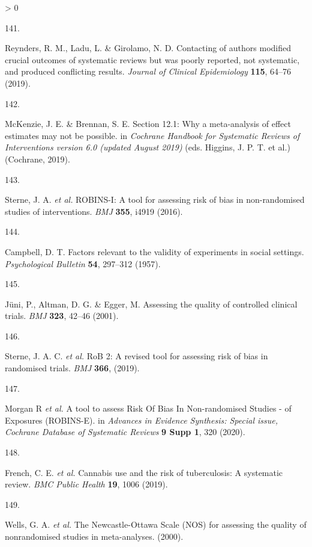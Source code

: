 \documentclass[a4paper, twoside]{templates/ociamthesis}
\newlength{\cslhangindent}
\newlength{\csllabelwidth}
\newenvironment{CSLReferences}[3] %
 {%
  \setlength{\parindent}{0pt}
  \ifodd #1 \everypar{\setlength{\hangindent}{\cslhangindent}}\ignorespaces\fi
  \ifnum #2 > 0
  \setlength{\parskip}{#2\baselineskip}
  \fi
 }%
 {}
\newcommand{\CSLLeftMargin}[1]{\parbox[t]{\maxof{\widthof{#1}}{\csllabelwidth}}{#1}}
\newcommand{\CSLRightInline}[1]{\parbox[t]{\linewidth - \csllabelwidth}{#1}}
\begin{document}
\begin{CSLReferences}{0}{0}
\leavevmode\hypertarget{ref-reynders2019}{}%
\CSLLeftMargin{141. }
\CSLRightInline{Reynders, R. M., Ladu, L. \& Girolamo, N. D. Contacting of authors modified crucial outcomes of systematic reviews but was poorly reported, not systematic, and produced conflicting results. \emph{Journal of Clinical Epidemiology} \textbf{115}, 64--76 (2019).}

\leavevmode\hypertarget{ref-mckenzie2019}{}%
\CSLLeftMargin{142. }
\CSLRightInline{McKenzie, J. E. \& Brennan, S. E. Section 12.1: Why a meta-analysis of effect estimates may not be possible. in \emph{Cochrane {Handbook} for {Systematic Reviews} of {Interventions} version 6.0 (updated {August} 2019)} (eds. Higgins, J. P. T. et al.) ({Cochrane}, 2019).}

\leavevmode\hypertarget{ref-sterne2016}{}%
\CSLLeftMargin{143. }
\CSLRightInline{Sterne, J. A. \emph{et al.} {ROBINS}-{I}: A tool for assessing risk of bias in non-randomised studies of interventions. \emph{BMJ} \textbf{355}, i4919 (2016).}

\leavevmode\hypertarget{ref-campbell1957}{}%
\CSLLeftMargin{144. }
\CSLRightInline{Campbell, D. T. Factors relevant to the validity of experiments in social settings. \emph{Psychological Bulletin} \textbf{54}, 297--312 (1957).}

\leavevmode\hypertarget{ref-juni2001}{}%
\CSLLeftMargin{145. }
\CSLRightInline{Jüni, P., Altman, D. G. \& Egger, M. Assessing the quality of controlled clinical trials. \emph{BMJ} \textbf{323}, 42--46 (2001).}

\leavevmode\hypertarget{ref-sterne2019}{}%
\CSLLeftMargin{146. }
\CSLRightInline{Sterne, J. A. C. \emph{et al.} {RoB} 2: A revised tool for assessing risk of bias in randomised trials. \emph{BMJ} \textbf{366}, (2019).}

\leavevmode\hypertarget{ref-morganr2020}{}%
\CSLLeftMargin{147. }
\CSLRightInline{Morgan R \emph{et al.} A tool to assess {Risk Of Bias In Non}-randomised {Studies} - of {Exposures} ({ROBINS}-{E}). in \emph{Advances in {Evidence Synthesis}: Special issue, {Cochrane Database} of {Systematic Reviews}} \textbf{9 Supp 1}, 320 (2020).}

\leavevmode\hypertarget{ref-french2019}{}%
\CSLLeftMargin{148. }
\CSLRightInline{French, C. E. \emph{et al.} Cannabis use and the risk of tuberculosis: A systematic review. \emph{BMC Public Health} \textbf{19}, 1006 (2019).}

\leavevmode\hypertarget{ref-wells2000}{}%
\CSLLeftMargin{149. }
\CSLRightInline{Wells, G. A. \emph{et al.} The {Newcastle}-{Ottawa Scale} ({NOS}) for assessing the quality of nonrandomised studies in meta-analyses. (2000).}


\end{CSLReferences}
\end{document}

